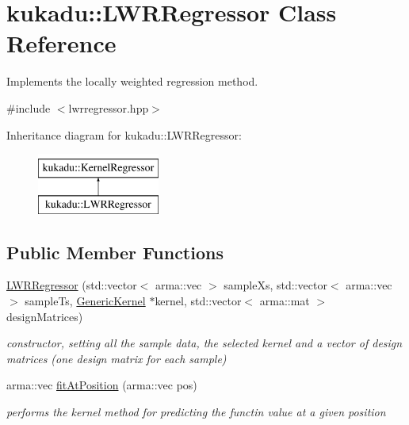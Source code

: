 \hypertarget{classkukadu_1_1LWRRegressor}{\section{kukadu\-:\-:L\-W\-R\-Regressor Class Reference}
\label{classkukadu_1_1LWRRegressor}
}


Implements the locally weighted regression method.  




{\ttfamily \#include $<$lwrregressor.\-hpp$>$}

Inheritance diagram for kukadu\-:\-:L\-W\-R\-Regressor\-:\begin{figure}[H]
\begin{center}
\leavevmode
\includegraphics[height=2.000000cm]{classkukadu_1_1LWRRegressor}
\end{center}
\end{figure}
\subsection*{Public Member Functions}
\begin{DoxyCompactItemize}
\item 
\hyperlink{classkukadu_1_1LWRRegressor_a587e643f830a35a4ecdd21c1c8ac162a}{L\-W\-R\-Regressor} (std\-::vector$<$ arma\-::vec $>$ sample\-Xs, std\-::vector$<$ arma\-::vec $>$ sample\-Ts, \hyperlink{classkukadu_1_1GenericKernel}{Generic\-Kernel} $\ast$kernel, std\-::vector$<$ arma\-::mat $>$ design\-Matrices)
\begin{DoxyCompactList}\small\item\em constructor, setting all the sample data, the selected kernel and a vector of design matrices (one design matrix for each sample) \end{DoxyCompactList}\item 
arma\-::vec \hyperlink{classkukadu_1_1LWRRegressor_ae7d3e23243abefbfd47677967b60918b}{fit\-At\-Position} (arma\-::vec pos)
\begin{DoxyCompactList}\small\item\em performs the kernel method for predicting the functin value at a given position \end{DoxyCompactList}\end{DoxyCompactItemize}


